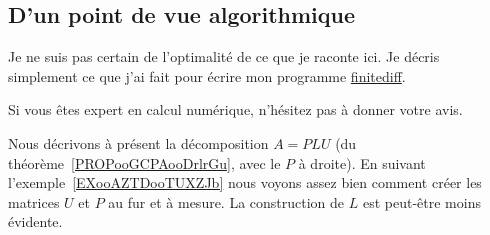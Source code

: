 \subsection{D'un point de vue algorithmique}

\begin{probleme}
    Je ne suis pas certain de l'optimalité de ce que je raconte ici. Je décris simplement ce que j'ai fait pour écrire mon programme \href{https://github.com/LaurentClaessens/finitediff}{finitediff}.

    Si vous êtes expert en calcul numérique, n'hésitez pas à donner votre avis.
\end{probleme}

Nous décrivons à présent la décomposition \( A=PLU\) (du théorème~\ref{PROPooGCPAooDrlrGu}, avec le \( P \) à droite). En suivant l'exemple~\ref{EXooAZTDooTUXZJb} nous voyons assez bien comment créer les matrices \( U\) et \( P\) au fur et à mesure. La construction de \( L\) est peut-être moins évidente.

